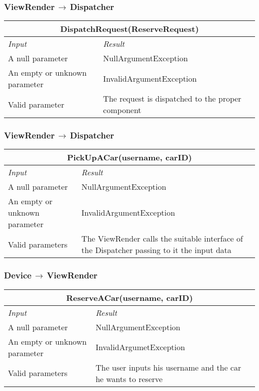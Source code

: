 \documentclass[11pt,a4paper]{report}
\begin{document}
\subsubsection{ViewRender$\,\to\,$Dispatcher}
\begin{tabularx}{\textwidth}{|X|X|}
	\hline
	\multicolumn{2}{|c|}{\textbf{DispatchRequest(ReserveRequest)}}\\
	\hline
	\textit{Input} & \textit{Result}\\
	\hline
	A null parameter & NullArgumentException\\
	\hline
	An empty or unknown parameter & InvalidArgumentException\\
	\hline
	Valid parameter & The request is dispatched to the proper component\\
	\hline
\end{tabularx}
\subsubsection{ViewRender$\,\to\,$Dispatcher}
\begin{tabularx}{\textwidth}{|X|X|}
	\hline
	\multicolumn{2}{|c|}{\textbf{PickUpACar(username, carID)}}\\
	\hline
	\textit{Input} & \textit{Result}\\
	\hline
	A null parameter & NullArgumentException\\
	\hline
	An empty or unknown parameter & InvalidArgumentException\\
	\hline
	Valid parameters &  The ViewRender calls the suitable interface of the Dispatcher passing to it the input data\\
	\hline
\end{tabularx}
\subsubsection{Device$\,\to\,$ViewRender}
\begin{tabularx}{\textwidth}{|X|X|}
	\hline
	\multicolumn{2}{|c|}{\textbf{ReserveACar(username, carID)}}\\
	\hline
	\textit{Input} & \textit{Result}\\
	\hline
	A null parameter & NullArgumentException\\
	\hline
	An empty or unknown parameter & InvalidArgumetException\\
	\hline
	Valid parameters & The user inputs his username and the car he wants to reserve\\
	\hline
\end{tabularx}
\end{document}
